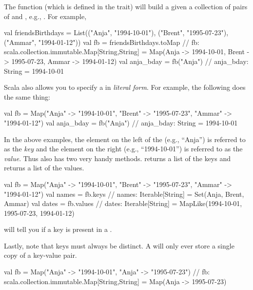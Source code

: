 \documentclass[9pt]{extbook}
\begin{document}
The  function (which is defined in the  trait) will build a  given a collection of pairs of  and , e.g., .  For example,

\begin{scalacode}
val friendsBirthdays = List(("Anja", "1994-10-01"), ("Brent", "1995-07-23"), ("Ammar", "1994-01-12"))
val fb = friendsBirthdays.toMap
// fb: scala.collection.immutable.Map[String,String] = Map(Anja -> 1994-10-01, Brent -> 1995-07-23, Ammar -> 1994-01-12)
val anja_bday = fb("Anja")
// anja_bday: String = 1994-10-01
\end{scalacode}

Scala also allows you to specify a  in \emph{literal form}.  For example, the following does the same thing:

\begin{scalacode}
val fb = Map("Anja" -> "1994-10-01", "Brent" -> "1995-07-23", "Ammar" -> "1994-01-12")
val anja_bday = fb("Anja")
// anja_bday: String = 1994-10-01
\end{scalacode}

In the above examples, the element on the left of the \scalainline{->} (e.g., ``Anja'') is referred to as the \emph{key} and the element on the right (e.g., ``1994-10-01'') is referred to as the \emph{value}.  Thus  also has two very handy methods.   returns a list of the keys and  returns a list of the values.

\begin{scalacode}
val fb = Map("Anja" -> "1994-10-01", "Brent" -> "1995-07-23", "Ammar" -> "1994-01-12")
val names = fb.keys
// names: Iterable[String] = Set(Anja, Brent, Ammar)
val dates = fb.values
// dates: Iterable[String] = MapLike(1994-10-01, 1995-07-23, 1994-01-12)
\end{scalacode}

 will tell you if a key is present in a .

Lastly, note that keys must always be distinct.  A  will only ever store a single copy of a key-value pair.

\begin{scalacode}
val fb = Map("Anja" -> "1994-10-01", "Anja" -> "1995-07-23")
// fb: scala.collection.immutable.Map[String,String] = Map(Anja -> 1995-07-23)
\end{scalacode}
\end{document}
